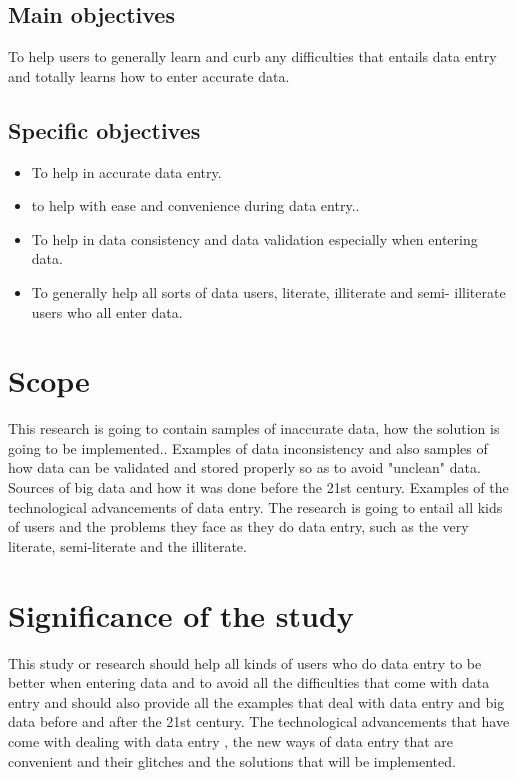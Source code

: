 \documentclass[12pt,]{article}
\begin{document}
\subsection*{ Main objectives}
To help users to generally learn and curb any difficulties that entails data entry and totally learns how to enter accurate data.
\subsection*{Specific objectives}
\begin{itemize}
\item To help in accurate data entry.
\item to help with ease and convenience during data entry..
\item To help in data consistency and data validation especially when entering data.
\item To generally help all sorts of data users, literate, illiterate and semi- illiterate users who all enter data.
\end{itemize}

\section{Scope}
This research is going to contain samples of inaccurate data, how the solution is going to be implemented.. Examples of data inconsistency and also samples of how data can be validated and stored properly so as to avoid "unclean" data. Sources of big data and how it was done before the 21st century. Examples of the technological advancements of data entry. The research is going to entail all kids of users and the problems they face as they do data entry, such as the very literate, semi-literate and the illiterate. 
\section{Significance of the study}
This study or research should help all kinds of users who do data entry to be better when entering data and to avoid all the difficulties that come with data entry and should also provide all the examples that deal with data entry and big data  before and after the 21st century. The technological advancements that have come with dealing with data entry , the new ways of data entry that are convenient and their glitches and the solutions that will be implemented.
\end{document}
